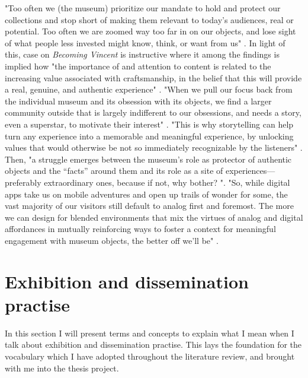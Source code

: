  "Too often we (the museum) prioritize our mandate to hold and protect our collections and stop short of making them relevant to today’s audiences, real or potential. Too often we are zoomed way too far in on our objects, and lose sight of what people less invested might know, think, or want from us" \autocite[p. 1]{vermeeren_museum_2018}. In light of this, \autocite{vermeeren_vincent_2018} case on \emph{Becoming Vincent} is instructive where it among the findings is implied how "the importance of and attention to content is related to the increasing value associated with craftsmanship, in the belief that this will provide a real, genuine, and authentic experience" \autocite[p. 298]{vermeeren_vincent_2018}. "When we pull our focus back from the individual museum and its obsession with its objects, we find a larger community outside that is largely indifferent to our obsessions, and needs a story, even a superstar, to motivate their interest" \autocite[p. 1]{vermeeren_museum_2018}. "This is why storytelling can help turn any experience into a memorable and meaningful experience, by unlocking values that would otherwise be not so immediately recognizable by the listeners" \autocite[p. 299]{vermeeren_vincent_2018}.
 Then, "a struggle emerges between the museum’s role as protector of authentic objects and the “facts” around them and its role as a site of experiences—preferably extraordinary ones, because if not, why bother? "\autocite[p. 1]{vermeeren_museum_2018}. "So, while digital apps take us on mobile adventures and open up trails of wonder for some, the vast majority of our visitors still default to analog first and foremost. The more we can design for blended environments that mix the virtues of analog and digital affordances in mutually reinforcing ways to foster a context for meaningful engagement with museum objects, the better off we’ll be" \autocite[p. 1]{vermeeren_museum_2018}.


\section{Exhibition and dissemination practise}
In this section I will present terms and concepts to explain what I mean when I talk about exhibition and dissemination practise. This lays the foundation for the vocabulary which I have adopted throughout the literature review, and brought with me into the thesis project. 

